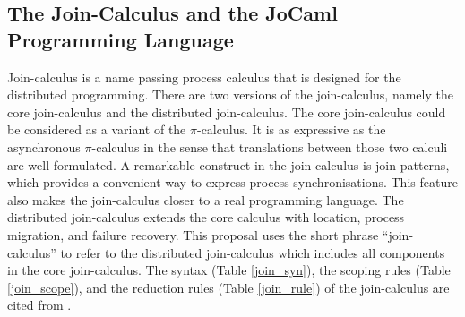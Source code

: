 \subsection{The Join-Calculus and the JoCaml Programming Language}
\label{sec:join}

Join-calculus \citep{RCHAM} is a name passing process calculus that is designed for the distributed programming.  There are two versions of the join-calculus, namely the core join-calculus and the distributed join-calculus.  The core join-calculus could be considered as a variant of the ${\pi}$-calculus.  It is as expressive as the asynchronous ${\pi}$-calculus in the sense that translations between those two calculi are well formulated.  A remarkable construct in the join-calculus is join patterns, which provides a convenient way to express process synchronisations.  This feature also makes the join-calculus closer to a real programming language.  The distributed join-calculus extends the core calculus with location, process migration, and failure recovery.  This proposal uses the short phrase ``join-calculus'' to refer to the distributed join-calculus which includes all components in the core join-calculus.  The syntax (Table \ref{join_syn}), the scoping rules (Table \ref{join_scope}), and the reduction rules (Table \ref{join_rule}) of the join-calculus are cited from \citep{join}.

